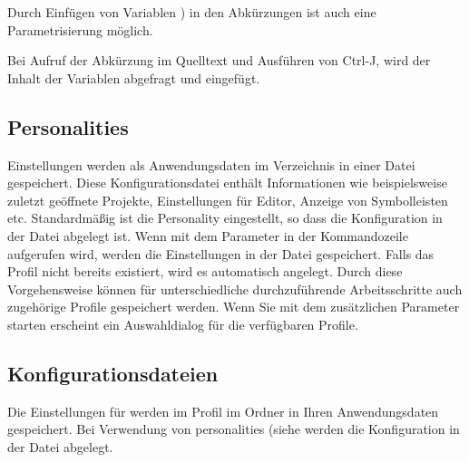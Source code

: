 
Durch Einfügen von Variablen ) in den Abkürzungen ist auch eine Parametrisierung möglich.


Bei Aufruf der Abkürzung  im Quelltext und Ausführen von Ctrl-J, wird der Inhalt der Variablen abgefragt und eingefügt.


\subsection{Personalities}\label{sec:personalities}

\codeblocks Einstellungen werden als Anwendungsdaten im Verzeichnis  in einer Datei  gespeichert. Diese Konfigurationsdatei enthält Informationen wie beispielsweise zuletzt geöffnete Projekte, Einstellungen für Editor, Anzeige von Symbolleisten etc. Standardmäßig ist die Personality  eingestellt, so dass die Konfiguration in der Datei  abgelegt ist. Wenn \codeblocks mit dem Parameter  in der Kommandozeile aufgerufen wird, werden die Einstellungen in der Datei  gespeichert. Falls das Profil nicht bereits existiert, wird es automatisch angelegt. Durch diese Vorgehensweise können für unterschiedliche durchzuführende Arbeitsschritte auch zugehörige Profile gespeichert werden. Wenn Sie \codeblocks mit dem zusätzlichen Parameter  starten erscheint ein Auswahldialog für die verfügbaren Profile.


\subsection{Konfigurationsdateien}

Die Einstellungen für \codeblocks werden im Profil  im Ordner  in Ihren Anwendungsdaten gespeichert. Bei Verwendung von personalities (siehe  werden die Konfiguration in der Datei  abgelegt.

